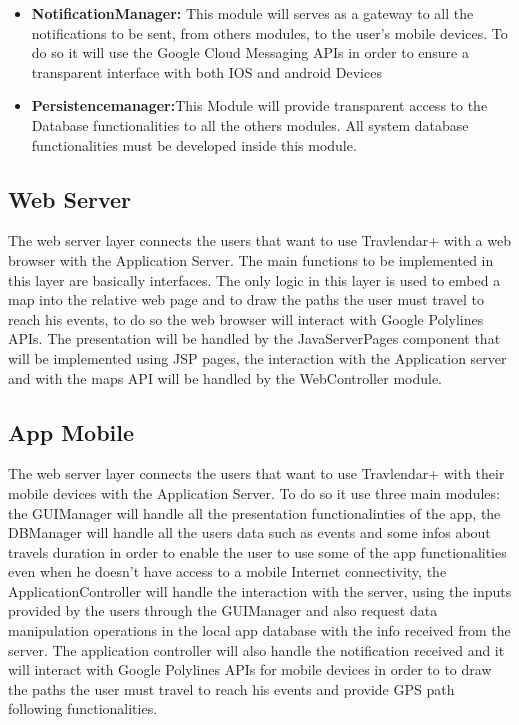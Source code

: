 \begin{itemize}
	\item \textbf{NotificationManager:} This module will serves as a gateway to all the notifications to be sent, from others modules, to the user's mobile devices. To do so it will use the Google Cloud Messaging APIs in order to ensure a transparent interface with both IOS and android Devices
	\item \textbf{Persistencemanager:}This Module will provide transparent access to the Database functionalities to all the others modules. All system database functionalities must be developed inside this module.
\end{itemize}
\subsection{Web Server}
\label{subsect:Web Server}
	The web server layer connects the users that want to use Travlendar+ with a web browser with the Application Server. \newline
	The main functions to be implemented in this layer are basically interfaces.
	The only logic in this layer is used to embed a map into the relative web page and to draw the paths the user must travel to reach his events, to do so the web browser will interact with Google Polylines APIs.\newline
	The presentation will be handled by the JavaServerPages component that will be implemented using JSP pages, the interaction with the Application server and with the maps API will be handled by the WebController module.

\subsection{App Mobile}
\label{subsect:App Mobile}
	The web server layer connects the users that want to use Travlendar+ with their mobile devices with the Application Server.
	To do so it use three main modules: the GUIManager will handle all the presentation functionalinties of the app, the DBManager will handle all the users data such as events and some infos about travels duration in order to enable the user to use some of the app functionalities even when he doesn't have access to a mobile Internet connectivity, the ApplicationController will handle the interaction with the server, using the inputs provided by the users through the GUIManager and also request data manipulation operations in the local app database with the info received from the server. The application controller will also handle the notification received and it will interact with Google Polylines APIs for mobile devices in order to to draw the paths the user must travel to reach his events and provide GPS path following functionalities.
	
